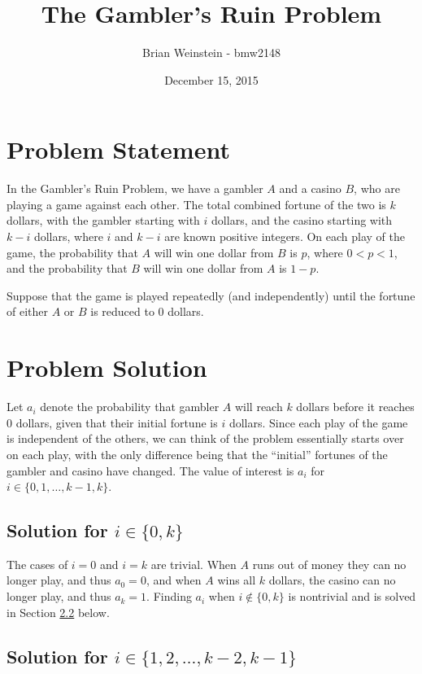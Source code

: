 \documentclass[a4paper,11pt]{article}
\title{The Gambler's Ruin Problem}
\author{Brian Weinstein - bmw2148}
\affil{Probability \& Statistics (STAT-W4700), Columbia University, Fall 2015}
\date{December 15, 2015}
\begin{document}
\maketitle
\doublespacing



\section{Problem Statement}

In the Gambler's Ruin Problem, we have a gambler $A$ and a casino $B$, who are playing a game against each other. The total combined fortune of the two is $k$ dollars, with the gambler starting with $i$ dollars, and the casino starting with $k-i$ dollars, where $i$ and $k-i$ are known positive integers. On each play of the game, the probability that $A$ will win one dollar from $B$ is $p$, where $0<p<1$, and the probability that $B$ will win one dollar from $A$ is $1-p$.

Suppose that the game is played repeatedly (and independently) until the fortune of either $A$ or $B$ is reduced to 0 dollars.



\section{Problem Solution}
Let $a_i$ denote the probability that gambler $A$ will reach $k$ dollars before it reaches 0 dollars, given that their initial fortune is $i$ dollars. Since each play of the game is independent of the others, we can think of the problem essentially starts over on each play, with the only difference being that the ``initial'' fortunes of the gambler and casino have changed. The value of interest is $a_i$ for $i\in\{0,1,\ldots,k-1,k\}$.

\subsection{Solution for $i \in \{0,k\}$}
\label{sec:solntrivial}

The cases of $i=0$ and $i=k$ are trivial. When $A$ runs out of money they can no longer play, and thus $a_0=0$, and when $A$ wins all $k$ dollars, the casino can no longer play, and thus $a_k=1$. Finding $a_i$ when $i\not\in\{0,k\}$ is nontrivial and is solved in Section \ref{sec:solnnontrivial} below.

\subsection{Solution for $i \in \{1,2,\ldots,k-2,k-1\}$}
\label{sec:solnnontrivial}
\end{document}

